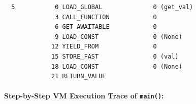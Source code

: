\begin{lstlisting}
  5           0 LOAD_GLOBAL              0 (get_val)
              3 CALL_FUNCTION            0
              6 GET_AWAITABLE            0
              9 LOAD_CONST               0 (None)
             12 YIELD_FROM               0
             15 STORE_FAST               0 (val)
             18 LOAD_CONST               0 (None)
             21 RETURN_VALUE
\end{lstlisting}

\hypertarget{step-by-step-vm-execution-trace-of-main}{%
\paragraph{\texorpdfstring{Step-by-Step VM Execution Trace of
\texttt{main()}:}{Step-by-Step VM Execution Trace of main():}}\label{step-by-step-vm-execution-trace-of-main}}

